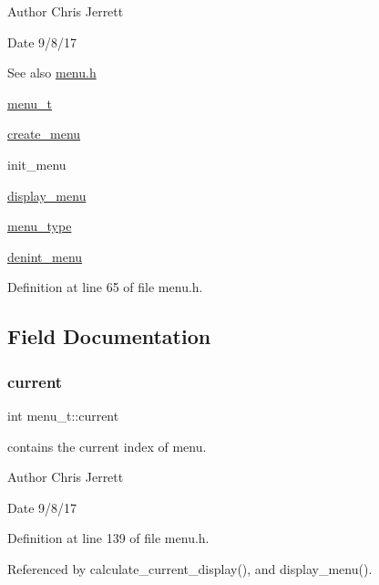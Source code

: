 \begin{DoxyAuthor}{Author}
Chris Jerrett 
\end{DoxyAuthor}
\begin{DoxyDate}{Date}
9/8/17 
\end{DoxyDate}
\begin{DoxySeeAlso}{See also}
\hyperlink{menu_8h}{menu.\+h} 

\hyperlink{structmenu__t}{menu\+\_\+t} 

\hyperlink{menu_8c_aff4fd27ff7707295d91c67fa52a6b021}{create\+\_\+menu} 

init\+\_\+menu 

\hyperlink{menu_8c_abfadedb104f89f672dd3045499975a71}{display\+\_\+menu} 

\hyperlink{menu_8h_a6bbf4baf5018b0d76aab6c2e6bf85e62}{menu\+\_\+type} 

\hyperlink{menu_8c_a05a36619ac6c9ba4544eddb83ee2a50d}{denint\+\_\+menu} 
\end{DoxySeeAlso}


Definition at line 65 of file menu.\+h.



\subsection{Field Documentation}
\mbox{\label{structmenu__t_a2acb18066898677ec5e2dc40eec811c5}} 
\subsubsection{\texorpdfstring{current}{current}}
{\footnotesize\ttfamily int menu\+\_\+t\+::current}



contains the current index of menu. 

\begin{DoxyAuthor}{Author}
Chris Jerrett 
\end{DoxyAuthor}
\begin{DoxyDate}{Date}
9/8/17 
\end{DoxyDate}


Definition at line 139 of file menu.\+h.



Referenced by calculate\+\_\+current\+\_\+display(), and display\+\_\+menu().

\mbox{\label{structmenu__t_a023063461c4a247e574abd6a55faf765}} 

